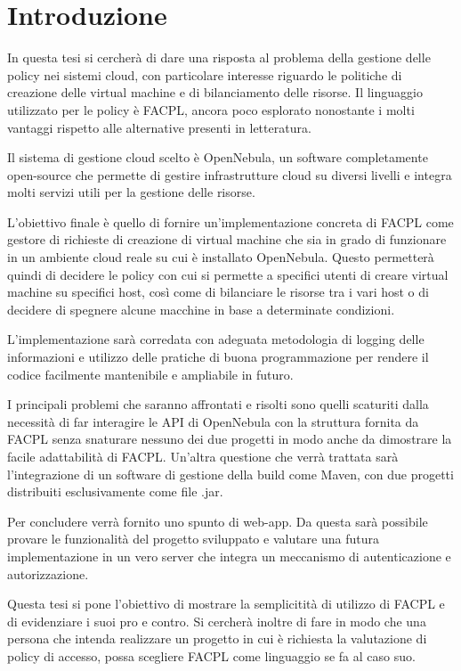 
\chapter{Introduzione}
In questa tesi si cercherà di dare una risposta al problema della gestione delle policy nei sistemi cloud, con particolare interesse riguardo le politiche di creazione delle virtual machine e di bilanciamento delle risorse. Il linguaggio utilizzato per le policy è FACPL, ancora poco esplorato nonostante i molti vantaggi rispetto alle alternative presenti in letteratura.\par
Il sistema di gestione cloud scelto è OpenNebula, un software completamente open-source che permette di gestire infrastrutture cloud su diversi livelli e integra molti servizi utili per la gestione delle risorse.\par
L'obiettivo finale è quello di fornire un'implementazione concreta di FACPL come gestore di richieste di creazione di virtual machine che sia in grado di funzionare in un ambiente cloud reale su cui è installato OpenNebula. Questo permetterà quindi di decidere le policy con cui si permette a specifici utenti di creare virtual machine su specifici host, così come di bilanciare le risorse tra i vari host o di decidere di spegnere alcune macchine in base a determinate condizioni.\par
L'implementazione sarà corredata con adeguata metodologia di logging delle informazioni e utilizzo delle pratiche di buona programmazione per rendere il codice facilmente mantenibile e ampliabile in futuro.\par
I principali problemi che saranno affrontati e risolti sono quelli scaturiti dalla necessità di far interagire le API di OpenNebula con la struttura fornita da FACPL senza snaturare nessuno dei due progetti in modo anche da dimostrare la facile adattabilità di FACPL. Un'altra questione che verrà trattata sarà l'integrazione di un software di gestione della build come Maven, con due progetti distribuiti esclusivamente come file .jar.\par
Per concludere verrà fornito uno spunto di web-app. Da questa sarà possibile provare le funzionalità del progetto sviluppato e valutare una futura implementazione in un vero server che integra un meccanismo di autenticazione e autorizzazione.\par
Questa tesi si pone l'obiettivo di mostrare la semplicitità di utilizzo di FACPL e di evidenziare i suoi pro e contro. Si cercherà inoltre di fare in modo che una persona che intenda realizzare un progetto in cui è richiesta la valutazione di policy di accesso, possa scegliere FACPL come linguaggio se fa al caso suo.
